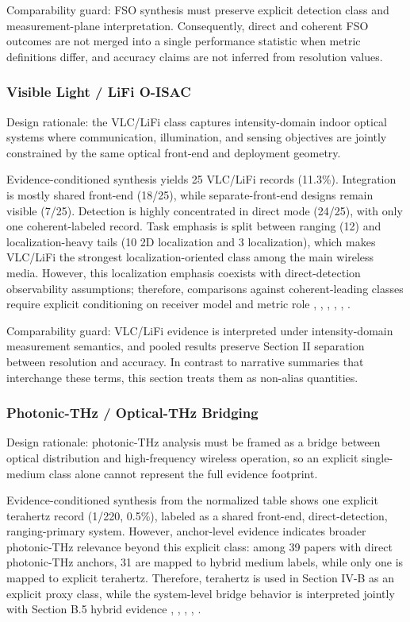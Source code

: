 Comparability guard: FSO synthesis must preserve explicit detection class and measurement-plane interpretation. Consequently, direct and coherent FSO outcomes are not merged into a single performance statistic when metric definitions differ, and accuracy claims are not inferred from resolution values.

\subsubsection{Visible Light / LiFi O-ISAC}
Design rationale: the VLC/LiFi class captures intensity-domain indoor optical systems where communication, illumination, and sensing objectives are jointly constrained by the same optical front-end and deployment geometry.

Evidence-conditioned synthesis yields 25 VLC/LiFi records (11.3\%). Integration is mostly shared front-end (18/25), while separate-front-end designs remain visible (7/25). Detection is highly concentrated in direct mode (24/25), with only one coherent-labeled record. Task emphasis is split between ranging (12) and localization-heavy tails (10 2D localization and 3 localization), which makes VLC/LiFi the strongest localization-oriented class among the main wireless media. However, this localization emphasis coexists with direct-detection observability assumptions; therefore, comparisons against coherent-leading classes require explicit conditioning on receiver model and metric role \cite{O_ISAC_068}, \cite{O_ISAC_303}, \cite{O_ISAC_039}, \cite{O_ISAC_327}, \cite{O_ISAC_062}, \cite{O_ISAC_009}.

Comparability guard: VLC/LiFi evidence is interpreted under intensity-domain measurement semantics, and pooled results preserve Section II separation between resolution and accuracy. In contrast to narrative summaries that interchange these terms, this section treats them as non-alias quantities.

\subsubsection{Photonic-THz / Optical-THz Bridging}
Design rationale: photonic-THz analysis must be framed as a bridge between optical distribution and high-frequency wireless operation, so an explicit single-medium class alone cannot represent the full evidence footprint.

Evidence-conditioned synthesis from the normalized table shows one explicit terahertz record (1/220, 0.5\%), labeled as a shared front-end, direct-detection, ranging-primary system. However, anchor-level evidence indicates broader photonic-THz relevance beyond this explicit class: among 39 papers with direct photonic-THz anchors, 31 are mapped to hybrid medium labels, while only one is mapped to explicit terahertz. Therefore, terahertz is used in Section IV-B as an explicit proxy class, while the system-level bridge behavior is interpreted jointly with Section B.5 hybrid evidence \cite{O_ISAC_016}, \cite{O_ISAC_077}, \cite{O_ISAC_105}, \cite{O_ISAC_070}, \cite{O_ISAC_029}.

